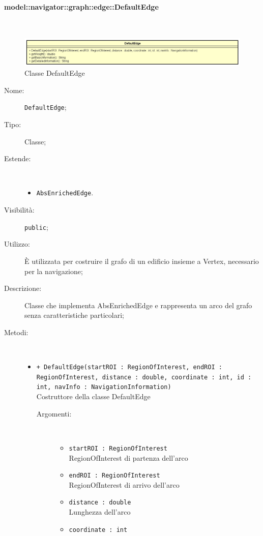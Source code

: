 \documentclass[../DefinizioneDiProdotto.tex]{subfiles}
\begin{document}
\paragraph{model::navigator::graph::edge::DefaultEdge}
\
\begin{figure}[H]
	\centering
	\includegraphics[width=\maxwidth]{img/DefaultEdge.png}
	\caption{Classe DefaultEdge}\label{fig:model::navigator::graph::edge::DefaultEdge} 
\end{figure}
\begin{description}
	\item[Nome:] \texttt{DefaultEdge};
	\item[Tipo:] Classe;
	\item[Estende:] \
	\begin{itemize}
		\item \texttt{AbsEnrichedEdge}.
	\end{itemize}
	\item[Visibilità:] \texttt{public};
	\item[Utilizzo:] È utilizzata per costruire il grafo di un edificio insieme a Vertex, necessario per la navigazione;
	\item[Descrizione:] Classe che implementa AbsEnrichedEdge e rappresenta un arco del grafo senza caratteristiche particolari;
	\item[Metodi:] \
	\begin{itemize}
		\item \texttt{+ DefaultEdge(startROI : RegionOfInterest, endROI : RegionOfInterest, distance : double, coordinate : int, id : int, navInfo : NavigationInformation)}\\
		Costruttore della classe DefaultEdge
		\begin{description}
			\item[Argomenti:] \
			\begin{itemize}
				\item \texttt{startROI : RegionOfInterest}\\
				RegionOfInterest di partenza dell'arco\item \texttt{endROI : RegionOfInterest}\\
				RegionOfInterest di arrivo dell'arco\item \texttt{distance : double}\\
				Lunghezza dell'arco\item \texttt{coordinate : int}\\

\end{itemize}
\end{description}
\end{itemize}
\end{description}
\end{document}
